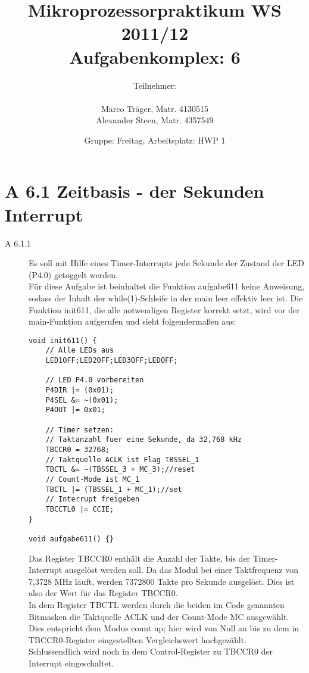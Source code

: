 \documentclass[11pt,a4paper,ngerman]{article}
\author{Teilnehmer:\\ \\Marco Träger, Matr. 4130515\\Alexander Steen, Matr. 4357549}
\date{Gruppe: Freitag, Arbeitsplatz: HWP 1}
\title{Mikroprozessorpraktikum WS 2011/12\\ Aufgabenkomplex: 6}
\begin{document}

\maketitle
\thispagestyle{fancy}
\newpage
\section*{A 6.1 Zeitbasis - der Sekunden Interrupt}

\begin{description}
\item[A 6.1.1] Es soll mit Hilfe eines Timer-Interrupts jede Sekunde der Zustand der LED (P4.0) getoggelt werden. \\

Für diese Aufgabe ist beinhaltet die Funktion aufgabe611 keine Anweisung, sodass der Inhalt der while(1)-Schleife in der main leer effektiv leer ist. Die Funktion init611, die alle notwendigen Register korrekt setzt, wird vor der main-Funktion aufgerufen und sieht folgendermaßen aus:

\begin{lstlisting}
void init611() {
	// Alle LEDs aus
	LED1OFF;LED2OFF;LED3OFF;LEDOFF;
    
    // LED P4.0 vorbereiten
    P4DIR |= (0x01);
    P4SEL &= ~(0x01);
    P4OUT |= 0x01;

    // Timer setzen:
    // Taktanzahl fuer eine Sekunde, da 32,768 kHz
    TBCCR0 = 32768; 
    // Taktquelle ACLK ist Flag TBSSEL_1
    TBCTL &= ~(TBSSEL_3 + MC_3);//reset 
    // Count-Mode ist MC_1
    TBCTL |= (TBSSEL_1 + MC_1);//set
    // Interrupt freigeben
    TBCCTL0 |= CCIE; 
}

void aufgabe611() {}
\end{lstlisting}

Das Register TBCCR0 enthält die Anzahl der Takte, bis der Timer-Interrupt ausgelöst werden soll. Da das Modul bei einer Taktfrequenz von 7,3728 MHz läuft, werden 7372800 Takte pro Sekunde ausgelöst. Dies ist also der Wert für das Register TBCCR0. \\
In dem Register TBCTL werden durch die beiden im Code genannten Bitmasken die Taktquelle ACLK und der Count-Mode MC ausgewählt. Dies entspricht dem Modus count up; hier wird von Null an bis zu dem in TBCCR0-Register eingestellten Vergleichswert hochgezählt. \\
Schlussendlich wird noch in dem Control-Register zu TBCCR0 der Interrupt eingeschaltet. \\


\end{description}
\end{document}
